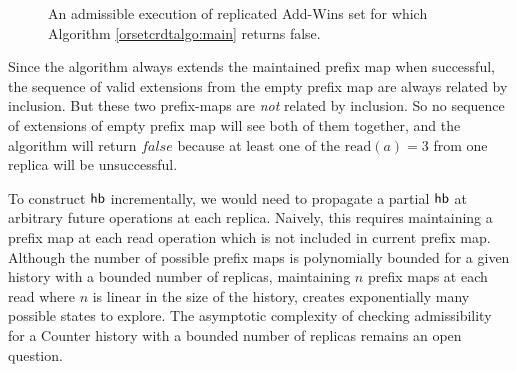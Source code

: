 \begin{figure}
\begin{minipage}{\textwidth}
    \caption{An admissible execution of replicated Add-Wins set for which Algorithm \ref{orsetcrdtalgo:main} returns false.}
      \label{correction:fig2}
  \end{minipage}
  \end{figure}

Since the algorithm always extends the maintained prefix map \ie when successful, the sequence of valid extensions from the empty prefix map are always related by inclusion. But these two prefix-maps are  \emph{not} related by inclusion. So no sequence of extensions of empty prefix map will see both of them together, and the algorithm will return $\mathit{false}$ because at least one of the $\mathrm{read}(a) = 3$ from one replica will be unsuccessful. 

To construct $\textsf{hb}$ incrementally, we would need to propagate a partial $\textsf{hb}$ at arbitrary future operations at each replica. Naively, this requires maintaining a prefix map at each \textrm{read} operation which is not included in current prefix map. Although the number of possible prefix maps is polynomially bounded for a given history with a bounded number of replicas, maintaining $n$ prefix maps at each \textrm{read} where $n$ is linear in the size of the history, creates exponentially many possible states to explore. The asymptotic complexity of checking admissibility for a Counter history with a bounded number of replicas remains an open question.

